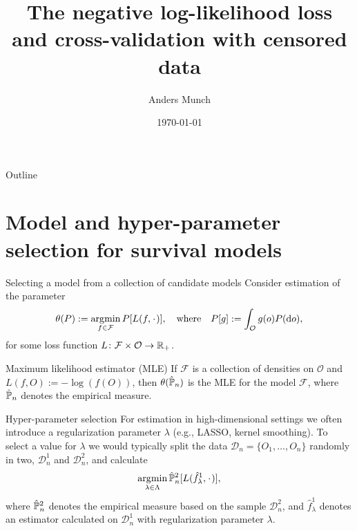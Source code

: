 \documentclass[smaller]{beamer}\usepackage{listings}
\institute{PhD Student, Section of Biostatistics \\ University of Copenhagen}
\author{Anders Munch}
\date{\today}
\title{The negative log-likelihood loss and cross-validation with censored data}
\begin{document}
\maketitle
\begin{frame}{Outline}
\tableofcontents
\end{frame}

\section{Model and hyper-parameter selection for survival models}
\label{sec:org2f4e39d}
\begin{frame}[label={sec:org49def99}]{Selecting a model from a collection of candidate models}
\small Consider estimation of the parameter
\begin{equation*}
  \theta(P) := \argmin_{f \in\mathcal{F}} P[L(f, \blank)],
  \quad \text{where} \quad
  P[g] := \int_{\mathcal{O}}g(o) P(\diff o),
\end{equation*}
for some loss function $L \colon \mathcal{F} \times \mathcal{O} \rightarrow \mathbb{R}_+$.

\begin{exampleblock}{\normalsize Maximum likelihood estimator (MLE)}
If \(\mathcal{F}\) is a collection of densities on \(\mathcal{O}\) and \(L(f, O) := -\log(f(O))\), then
\(\theta(\hat{\mathbb{P}}_n)\) is the MLE for the model \(\mathcal{F}\), where \(\hat{\mathbb{P}}_n\) denotes the empirical
measure.
\end{exampleblock}

\begin{exampleblock}{\normalsize Hyper-parameter selection}
For estimation in high-dimensional settings we often introduce a regularization parameter $\lambda$
(e.g., LASSO, kernel smoothing). To select a value for $\lambda$ we would typically split the data
$\mathcal{D}_n = \{O_1, \dots, O_n\}$ randomly in two, $\mathcal{D}_n^1$ and $\mathcal{D}_n^2$, and
calculate
\begin{equation*}
\argmin_{\lambda\in\Lambda} \empmeas^{2}[L(\hat{f}^{1}_{\lambda}, \blank)],
\end{equation*}
where $\hat{\mathbb{P}}_n^2$ denotes the empirical measure based on the sample $\mathcal{D}_n^2$, and
$\hat{f}^1_{\lambda}$ denotes an estimator calculated on $\mathcal{D}_n^1$ with regularization
parameter $\lambda$.
\end{exampleblock}
\end{frame}
\end{document}
